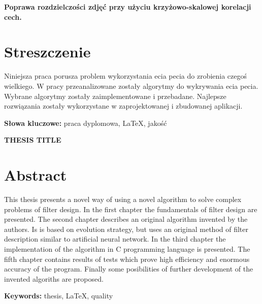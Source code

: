 \newpage
\begin{center}
\large \bf
Poprawa rozdzielczości zdjęć przy użyciu krzyżowo-skalowej korelacji cech.
\end{center}

\section*{Streszczenie}
Niniejsza praca porusza problem wykorzystania ecia pecia do zrobienia czegoś wielkiego. W pracy przeanalizowane zostały algorytmy do wykrywania ecia pecia. Wybrane algorytmy zostały zaimplementowane i przebadane. Najlepsze rozwiązania zostały wykorzystane w zaprojektowanej i zbudowanej aplikacji.

\bigskip
{\noindent\bf Słowa kluczowe:} praca dyplomowa, LaTeX, jakość

\vskip 2cm

\newpage


\begin{center}
\large \bf
THESIS TITLE
\end{center}

\section*{Abstract}
This thesis presents a novel way of using a novel algorithm to solve complex
problems of filter design. In the first chapter the fundamentals of filter design
are presented. The second chapter describes an original algorithm invented by the
authors. Is is based on evolution strategy, but uses an original method of filter
description similar to artificial neural network. In the third chapter the implementation
of the algorithm in C programming language is presented. The fifth chapter contains results
of tests which prove high efficiency and enormous accuracy of the program. Finally some
posibilities of further development of the invented algoriths are proposed.

\bigskip
{\noindent\bf Keywords:} thesis, LaTeX, quality

\vfill